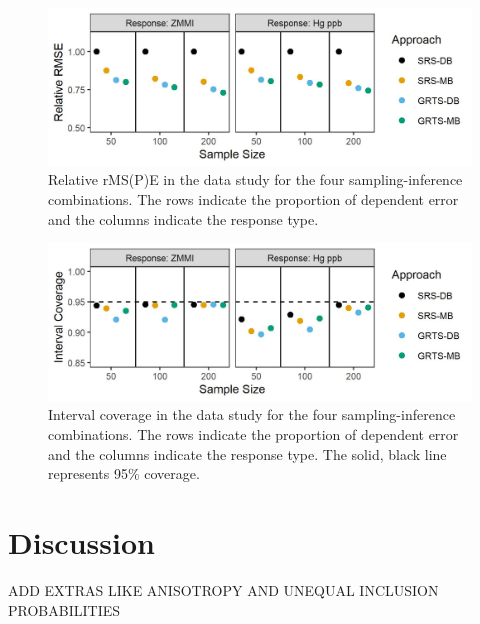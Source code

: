 \documentclass[]{elsarticle} %
\begin{document}
\begin{figure}
  \centering
  \includegraphics[width = 1\linewidth]{figures/data_rmspe_eff.jpeg}
  \caption{Relative rMS(P)E in the data study for the four sampling-inference combinations. The rows indicate the proportion of dependent error and the columns indicate the response type.}
  \label{fig:data_rmspe_eff}
\end{figure}

\begin{figure}
  \centering
  \includegraphics[width = 1\linewidth]{figures/data_coverage.jpeg}
  \caption{Interval coverage in the data study for the four sampling-inference combinations. The rows indicate the proportion of dependent error and the columns indicate the response type. The solid, black line represents 95\% coverage.}
  \label{fig:data_figconf}
\end{figure}

\hypertarget{sec:discussion}{%
\section{Discussion}\label{sec:discussion}}

ADD EXTRAS LIKE ANISOTROPY AND UNEQUAL INCLUSION PROBABILITIES
\end{document}
